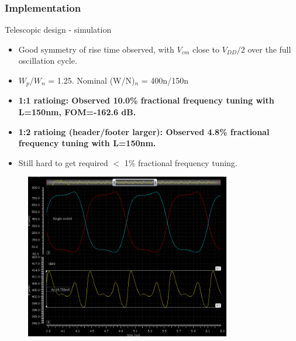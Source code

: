 \documentclass[t, screen, aspectratio=43]{beamer}
\begin{document}
\begin{frame}
	\frametitle{Implementation}
	\begin{block}{Telescopic design - simulation}
				\vspace{2em}
		\begin{minipage}{6cm}
			\tiny


			\begin{itemize}[itemsep=4pt,label=\protect---]
				\item Good symmetry of rise time observed, with $V_{cm}$ close to $V_{DD}/2$ over the full oscillation cycle.
				\item $W_p$/$W_n$ = 1.25. Nominal (W/N)$_n$ = 400n/150n
				\item \textbf{1:1 ratioing: Observed 10.0\% fractional frequency tuning with L=150nm, {\color{red}FOM=-162.6 dB.}}
				\item \textbf{1:2 ratioing (header/footer larger): Observed 4.8\% fractional frequency tuning with L=150nm.}
				\item Still hard to get required $<$ 1\% fractional frequency tuning.
			\end{itemize}
		\end{minipage}%
		\begin{minipage}{6cm}
			\begin{figure}[htb!]
			        \centering
			        \includegraphics[width=0.8\textwidth, angle=0]{telescopic_wfm}
			\end{figure}

		\end{minipage}%

	\end{block}	
\end{frame}
\end{document}
